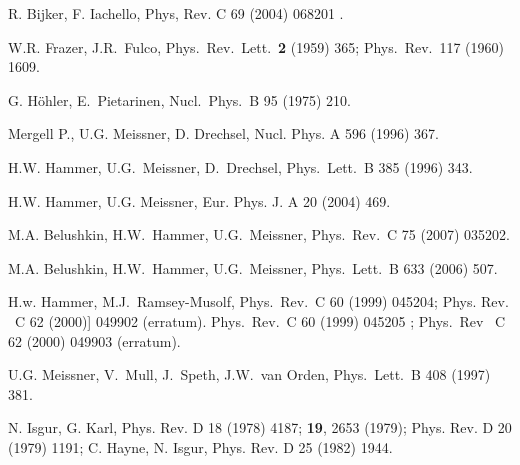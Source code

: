 \begin{thebibliography}{PPV06}
R. Bijker, F. Iachello, Phys, Rev. C 69 (2004) 068201 .

  W.R. Frazer, J.R.~Fulco,
  Phys.\ Rev.\ Lett.\  {\bf 2} (1959) 365; 
Phys.\ Rev.\ 117 (1960) 1609. 

  G. H\"ohler, E.~Pietarinen,
  Nucl.\ Phys.\ B 95 (1975) 210.

Mergell P., U.G. Meissner, D. Drechsel, Nucl. Phys. A 596 (1996) 367.

 H.W. Hammer, U.G.~Meissner, D.~Drechsel,
  Phys.\ Lett.\ B 385 (1996) 343.

H.W. Hammer, U.G. Meissner, Eur. Phys. J. A 20 (2004) 469.

  M.A. Belushkin, H.W.~Hammer, U.G.~Meissner,
  Phys.\ Rev.\  C 75 (2007) 035202. 

M.A. Belushkin, H.W.~Hammer, U.G.~Meissner,
  Phys.\ Lett.\ B 633 (2006) 507.

  H.w. Hammer, M.J.~Ramsey-Musolf,
  Phys.\ Rev.\ C 60 (1999) 045204;
  Phys. Rev. \ C 62 (2000)] 049902 (erratum).
  Phys.\ Rev.\ C 60 (1999) 045205 ;  Phys.\ Rev \ C 62 (2000) 049903 (erratum).

U.G. Meissner, V.~Mull, J.~Speth, J.W.~van Orden,
  Phys.\ Lett.\ B 408 (1997) 381.

N. Isgur, G. Karl,  Phys. Rev. D 18 (1978) 4187; 
{\bf 19}, 2653 (1979); 
Phys. Rev. D 20 (1979) 1191; 
C. Hayne, N. Isgur, Phys. Rev. D 25 (1982) 1944.


\end{thebibliography}
